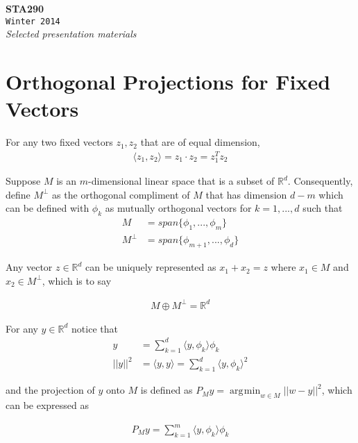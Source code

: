 \documentclass[a4paper, 11pt]{report}
\newcommand{\R}{\mathbb{R}}
\newcommand{\newchapter}[2]{
	\chapter{#1}
	\addtocontents{toc}{\vspace{.1in} \hspace{.25in} $\cdot$ #2 \par}
}
\DeclareMathOperator*{\argmin}{\arg\!\min}
\newcommand*{\titleTH}{\begingroup %
	\center
	\vspace*{\baselineskip} %
	\vspace{2.5in}
	{\Huge\bfseries STA290}\\[\baselineskip] %
	{\Huge\texttt{Winter 2014}}\\[\baselineskip] %
	{\Large \textit{Selected presentation materials}}\par %
	\vspace*{3\baselineskip} %
\endgroup}
\begin{document}
\titleTH %
\thispagestyle{empty}
\tableofcontents




\newchapter{Orthogonal Projections for Fixed Vectors}{2/13/14}


For any two fixed vectors $z_1,z_2$ that are of equal dimension,
\begin{align*}
	\langle z_1,z_2\rangle = z_1\cdot z_2 = z_1^{T}z_2
\end{align*}

Suppose $M$ is an $m$-dimensional linear space that is a subset of $\R^d$. Consequently, define $M^{\perp}$ as the orthogonal compliment of $M$ that has dimension $d-m$ which can be defined with $\phi_k$ as mutually orthogonal vectors for $k = 1,...,d$ such that
\begin{align*}
	M &= span\{\phi_1,...,\phi_m\} \label{span} \\
	M^{\perp} & = span\{\phi_{m+1},...,\phi_d\} 
\end{align*}

Any vector $z \in \R^d$ can be uniquely represented as $x_1 + x_2 = z $ where $x_1 \in M$ and $x_2 \in M^{\perp}$, which is to say


\begin{align*}
	M \oplus M^{\perp} = \R^d
\end{align*}

\vspace{.1in}


For any $y \in \R^d$ notice that 
\begin{align*}
	y &= \sum\limits_{k=1}^d \langle y, \phi_k\rangle\phi_k \\
	||y||^2 &= \langle y,y\rangle = \sum\limits_{k=1}^d \langle y, \phi_k\rangle^2 
\end{align*}

\vspace{.1in}

and the projection of $y$ onto $M$ is defined as 
$P_My = \argmin_{w \in M} ||w-y||^2 $, which can be expressed as

\begin{align}
\boxed{P_My = \sum\limits_{k=1}^m \langle y, \phi_k\rangle\phi_k }
\end{align}
\end{document}
